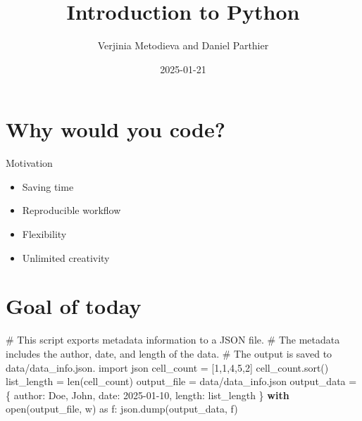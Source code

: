 \documentclass[
  letterpaper,
  DIV=11,
  numbers=noendperiod]{scrartcl}
\title{Introduction to Python}
\author{Verjinia Metodieva and Daniel Parthier}
\date{2025-01-21}
\newenvironment{Shaded}{\begin{snugshade}}{\end{snugshade}}
\newcommand{\BuiltInTok}[1]{\textcolor[rgb]{0.00,0.23,0.31}{#1}}
\newcommand{\CommentTok}[1]{\textcolor[rgb]{0.37,0.37,0.37}{#1}}
\newcommand{\ControlFlowTok}[1]{\textcolor[rgb]{0.00,0.23,0.31}{\textbf{#1}}}
\newcommand{\DecValTok}[1]{\textcolor[rgb]{0.68,0.00,0.00}{#1}}
\newcommand{\ImportTok}[1]{\textcolor[rgb]{0.00,0.46,0.62}{#1}}
\newcommand{\NormalTok}[1]{\textcolor[rgb]{0.00,0.23,0.31}{#1}}
\newcommand{\OperatorTok}[1]{\textcolor[rgb]{0.37,0.37,0.37}{#1}}
\newcommand{\StringTok}[1]{\textcolor[rgb]{0.13,0.47,0.30}{#1}}
\providecommand{\tightlist}{%
  \setlength{\itemsep}{0pt}\setlength{\parskip}{0pt}}\usepackage{longtable,booktabs,array}
\begin{document}
\maketitle


\section{Why would you code?}\label{why-would-you-code}

Motivation

\begin{itemize}
\tightlist
\item
  Saving time
\item
  Reproducible workflow
\item
  Flexibility
\item
  Unlimited creativity
\end{itemize}

\section{Goal of today}\label{goal-of-today}

\begin{Shaded}
\begin{Highlighting}[]
\CommentTok{\# This script exports metadata information to a JSON file.}
\CommentTok{\# The metadata includes the author, date, and length of the data.}
\CommentTok{\# The output is saved to \textquotesingle{}data/data\_info.json\textquotesingle{}.}
\ImportTok{import}\NormalTok{ json}
\NormalTok{cell\_count }\OperatorTok{=}\NormalTok{ [}\DecValTok{1}\NormalTok{,}\DecValTok{1}\NormalTok{,}\DecValTok{4}\NormalTok{,}\DecValTok{5}\NormalTok{,}\DecValTok{2}\NormalTok{]}
\NormalTok{cell\_count.sort()}
\NormalTok{list\_length }\OperatorTok{=} \BuiltInTok{len}\NormalTok{(cell\_count)}
\NormalTok{output\_file }\OperatorTok{=} \StringTok{\textquotesingle{}data/data\_info.json\textquotesingle{}}
\NormalTok{output\_data }\OperatorTok{=}\NormalTok{ \{}
    \StringTok{\textquotesingle{}author\textquotesingle{}}\NormalTok{: }\StringTok{\textquotesingle{}Doe, John\textquotesingle{}}\NormalTok{,}
    \StringTok{\textquotesingle{}date\textquotesingle{}}\NormalTok{: }\StringTok{\textquotesingle{}2025{-}01{-}10\textquotesingle{}}\NormalTok{,}
    \StringTok{\textquotesingle{}length\textquotesingle{}}\NormalTok{: list\_length}
\NormalTok{\}}
\ControlFlowTok{with} \BuiltInTok{open}\NormalTok{(output\_file, }\StringTok{\textquotesingle{}w\textquotesingle{}}\NormalTok{) }\ImportTok{as}\NormalTok{ f:}
\NormalTok{    json.dump(output\_data, f)}
\end{Highlighting}
\end{Shaded}
\end{document}
